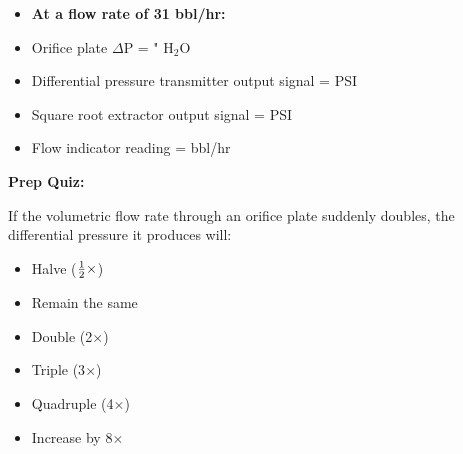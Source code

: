 \vskip 10pt

\begin{itemize}
\item {} {\bf At a flow rate of 31 bbl/hr:}
\vskip 5pt
\item{} Orifice plate $\Delta$P =  " H$_{2}$O
\vskip 5pt
\item{} Differential pressure transmitter output signal =  PSI
\vskip 5pt
\item{} Square root extractor output signal =  PSI
\vskip 5pt
\item{} Flow indicator reading =  bbl/hr
\end{itemize}

\vfil \eject

\noindent
{\bf Prep Quiz:}

If the volumetric flow rate through an orifice plate suddenly doubles, the differential pressure it produces will:

\begin{itemize}
\item{} Halve (${1 \over 2} \times$) 
\vskip 5pt 
\item{} Remain the same
\vskip 5pt 
\item{} Double (2$\times$)
\vskip 5pt 
\item{} Triple (3$\times$)
\vskip 5pt 
\item{} Quadruple (4$\times$)
\vskip 5pt 
\item{} Increase by 8$\times$ 
\end{itemize}






